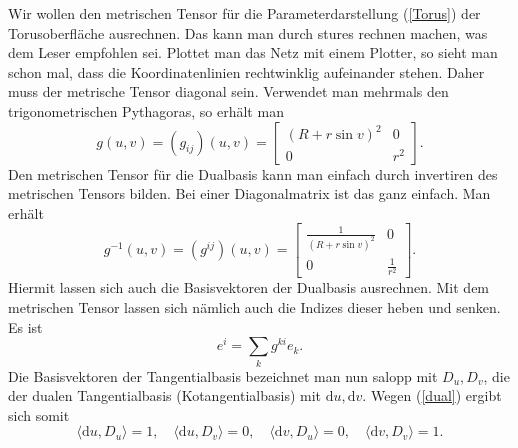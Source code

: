 \documentclass[a4paper,12pt,fleqn]{article}
\begin{document}
Wir wollen den metrischen Tensor für die Parameterdarstellung
(\ref{Torus}) der Torusoberfläche ausrechnen. Das kann man
durch stures rechnen
machen, was dem Leser empfohlen sei. Plottet man das Netz mit
einem Plotter, so sieht man schon mal, dass die Koordinatenlinien
rechtwinklig aufeinander stehen. Daher muss der metrische Tensor
diagonal sein. Verwendet man mehrmals den trigonometrischen
Pythagoras, so erhält man
\begin{equation}
g(u,v) = (g_{ij})(u,v)= \begin{bmatrix}
(R+r\sin v)^2 & 0\\
0 & r^2
\end{bmatrix}.
\end{equation}
Den metrischen Tensor für die Dualbasis kann man einfach durch
invertiren des metrischen Tensors bilden. Bei einer Diagonalmatrix
ist das ganz einfach. Man erhält
\begin{equation}
g^{-1}(u,v) = (g^{ij})(u,v)= \begin{bmatrix}
\frac{1}{(R+r\sin v)^2} & 0\\
0 & \frac{1}{r^2}
\end{bmatrix}.
\end{equation}
Hiermit lassen sich auch die Basisvektoren der Dualbasis ausrechnen.
Mit dem metrischen Tensor lassen sich nämlich auch die Indizes
dieser heben und senken. Es ist
\begin{equation}\label{Bvheben}
e^i = \sum_{k} g^{ki}e_k.
\end{equation}
Die Basisvektoren der Tangentialbasis bezeichnet man nun salopp
mit \(D_u,D_v\), die der dualen Tangentialbasis (Kotangentialbasis)
mit \(\mathrm du,\mathrm dv\). Wegen (\ref{dual}) ergibt sich
somit
\begin{equation}\label{Tdual}
\langle\mathrm du,D_u\rangle=1,\quad
\langle\mathrm du,D_v\rangle=0,\quad
\langle\mathrm dv,D_u\rangle=0,\quad
\langle\mathrm dv,D_v\rangle=1.
\end{equation}
\end{document}
